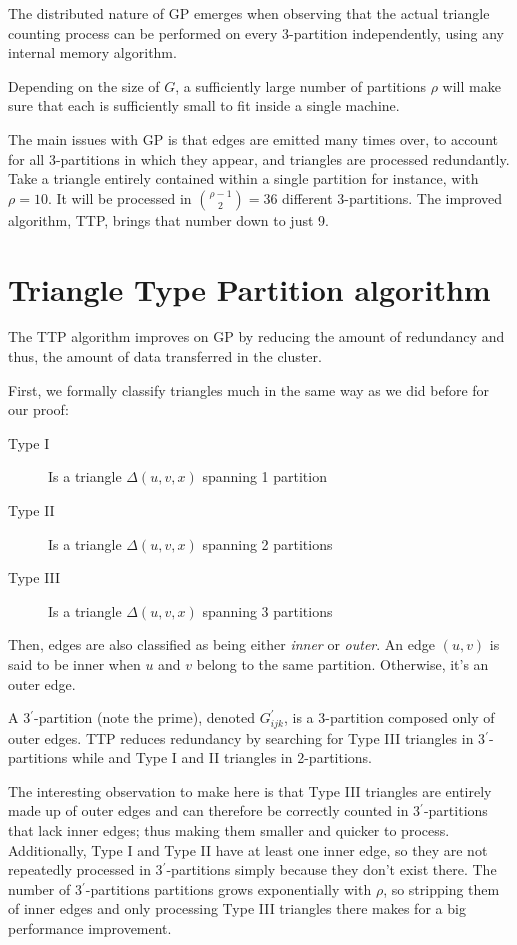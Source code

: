 \documentclass[paper=a4, fontsize=11pt]{scrartcl}
\numberwithin{equation}{section}
\numberwithin{figure}{section}
\numberwithin{table}{section}
\begin{document}
The distributed nature of GP emerges when observing that the actual triangle
counting process can be performed on every 3-partition independently, using any
internal memory algorithm.

Depending on the size of $G$, a sufficiently large number of partitions $\rho$
will make sure that each is sufficiently small to fit inside a single machine.

The main issues with GP is that edges are emitted many times over, to account
for all 3-partitions in which they appear, and triangles are processed
redundantly. Take a triangle entirely contained within a single partition for
instance, with $\rho=10$. It will be processed in $\binom{\rho-1}{2}=36$
different 3-partitions. The improved algorithm, TTP, brings that number down to
just 9.

\section{Triangle Type Partition algorithm}

The TTP algorithm \cite{park2013efficient} improves on GP by reducing the amount
of redundancy and thus, the amount of data transferred in the cluster.

First, we formally classify triangles much in the same way as we did before for
our proof:
\begin{description}
    \item[Type I] Is a triangle $\Delta(u, v, x)$ spanning 1 partition
    \item[Type II] Is a triangle $\Delta(u, v, x)$ spanning 2 partitions
    \item[Type III] Is a triangle $\Delta(u, v, x)$ spanning 3 partitions
\end{description}

Then, edges are also classified as being either \emph{inner} or \emph{outer}. An
edge $(u,v)$ is said to be inner when $u$ and $v$ belong to the same partition.
Otherwise, it's an outer edge.

A 3$^\prime$-partition (note the prime), denoted $G^{\prime}_{ijk}$, is a
3-partition composed only of outer edges. TTP reduces redundancy by searching
for Type III triangles in 3$^\prime$-partitions while and Type I and II
triangles in 2-partitions.

The interesting observation to make here is that Type III triangles are entirely
made up of outer edges and can therefore be correctly counted in
3$^\prime$-partitions that lack inner edges; thus making them smaller and
quicker to process. Additionally, Type I and Type II have at least one inner
edge, so they are not repeatedly processed in 3$^\prime$-partitions simply
because they don't exist there. The number of 3$^\prime$-partitions partitions
grows exponentially with $\rho$, so stripping them of inner edges and only
processing Type III triangles there makes for a big performance improvement.
\end{document}
